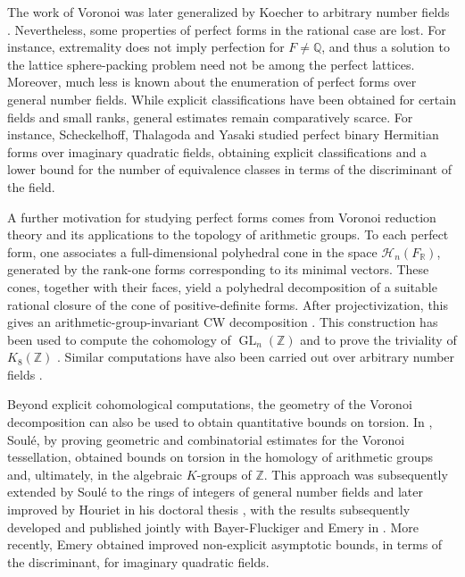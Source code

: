 \documentclass[11pt,a4paper,twoside]{amsart}
\theoremstyle{plain}
\theoremstyle{definition}
\newcommand{\GL}[0]{\operatorname{GL}_n(\mathbb{Z})}
\newcommand{\Her}[0]{\mathcal{H}_n(\fr)}
\newcommand{\fr}[0]{F_\mathbb{R}}
\begin{document}
The work of Voronoi \cite{Voronoi1908} was later generalized by Koecher to arbitrary number fields \cite{Koecher}. Nevertheless, some properties of perfect forms in the rational case are lost. For instance, extremality does not imply perfection for $F\neq\mathbb Q$, and thus a solution to the lattice sphere-packing problem need not be among the perfect lattices. Moreover, much less is known about the enumeration of perfect forms over general number fields. While explicit classifications have been obtained for certain fields and small ranks, general estimates remain comparatively scarce. For instance, Scheckelhoff, Thalagoda and Yasaki \cite{scheckelhoff_thalagoda_yasaki} studied perfect binary Hermitian forms over imaginary quadratic fields, obtaining explicit classifications and a lower bound for the number of equivalence classes in terms of the discriminant of the field. 

A further motivation for studying perfect forms comes from Voronoi reduction theory and its applications to the topology of arithmetic groups. To each perfect form, one associates a full-dimensional polyhedral cone in the space $\Her$, generated by the rank-one forms corresponding to its minimal vectors. These cones, together with their faces, yield a polyhedral decomposition of a suitable rational closure of the cone of positive-definite forms. After projectivization, this gives an arithmetic-group-invariant CW decomposition \cite{Coulangeon}. This construction has been used to compute the cohomology of $\GL$ \cite{philippe_advances} and to prove the triviality of $K_8(\mathbb Z)$ \cite{k8}. Similar computations have also been carried out over arbitrary number fields \cite{hermitian, Vor_comp_num_fields}.


Beyond explicit cohomological computations, the geometry of the Voronoi decomposition can also be used to obtain quantitative bounds on torsion. In \cite{soule_bounds}, Soulé, by proving geometric and combinatorial estimates for the Voronoi tessellation, obtained bounds on torsion in the homology of arithmetic groups and, ultimately, in the algebraic $K$-groups of $\mathbb{Z}$.
This approach was subsequently extended by Soulé \cite{soule_hermitian_bounds} to the rings of integers of general number fields and later improved by Houriet in his doctoral thesis \cite{Juliet_PHD}, with the results subsequently developed and published jointly with Bayer-Fluckiger and Emery in \cite{emery}. More recently, Emery \cite{Emery_imaginary_quad} obtained improved non-explicit asymptotic bounds, in terms of the discriminant, for imaginary quadratic fields.
\end{document}
